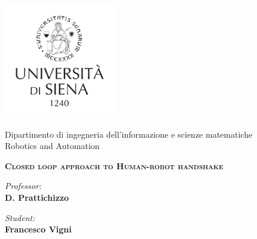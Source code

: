 \thispagestyle{empty}
\begin{center}
\includegraphics[height=5cm]{Figure/LOGO_UNISI.pdf}

\large{ \sc Dipartimento di ingegneria dell'informazione e scienze matematiche}
\vspace{0.5cm
\large Computer and Automation Engineering}\\
\vspace{0.5cm}
\large {\sc Robotics and Automation}
\vspace{1cm}
 

\textbf{\scshape{\LARGE{Closed loop approach to Human-robot handshake\\}}}

\end{center}

\noindent\begin{minipage}[b]{0.47\textwidth}
\large
\emph{Professor:}\\
\textbf{D. Prattichizzo}  
\end{minipage}
\hfill
\begin{minipage}[b]{0.47\textwidth}\raggedleft
 \large
\emph{Student:}\\
\textbf{Francesco Vigni}\\


\end{minipage}

